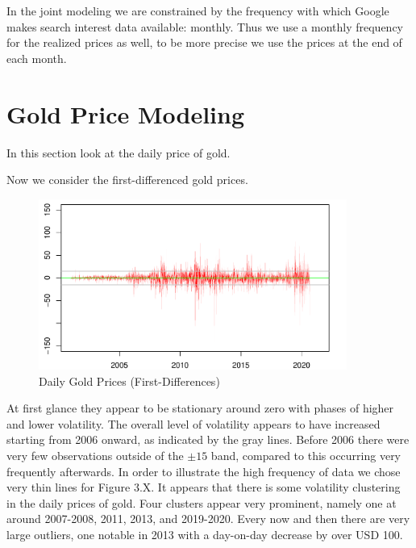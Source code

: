\documentclass[a4paper]{article}
\theoremstyle{definition}
\begin{document}
In the joint modeling we are constrained by the frequency with which Google makes search interest data available: monthly. Thus we use a monthly frequency for the realized prices as well, to be more precise we use the prices at the end of each month. 
\newpage
\section{Gold Price Modeling}
In this section look at the daily price of gold. 
%
%
%

Now we consider the first-differenced gold prices.
	\begin{figure}[!t]
	\centering
	\caption{Daily Gold Prices (First-Differences)}
	\includegraphics[width=0.90\textwidth]{goldFDHFalone.pdf}
	\end{figure}
At first glance they appear to be stationary around zero with phases of higher and lower volatility. The overall level of volatility appears to have increased starting from 2006 onward, as indicated by the gray lines. Before 2006 there were very few observations outside of the $\pm 15$ band, compared to this occurring very frequently afterwards. In order to illustrate the high frequency of data we chose very thin lines for Figure 3.X. 
It appears that there is some volatility clustering in the daily prices of gold. Four clusters appear very prominent, namely one at around 2007-2008, 2011, 2013, and 2019-2020. Every now and then there are very large outliers, one notable in 2013 with a day-on-day decrease by over USD 100.





\newpage
\end{document}
